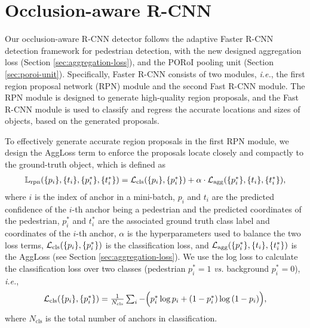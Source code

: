 \documentclass[runningheads]{llncs}
\def\ie{{\em i.e.}}
\begin{document}
\section{Occlusion-aware R-CNN}
Our occlusion-aware R-CNN detector follows the adaptive Faster R-CNN detection framework \cite{DBLP:conf/cvpr/ZhangBS17} for pedestrian detection, with the new designed aggregation loss (Section \ref{sec:aggregation-loss}), and the PORoI pooling unit (Section \ref{sec:poroi-unit}). Specifically, Faster R-CNN \cite{DBLP:journals/pami/RenHG017} consists of two modules, \ie, the first region proposal network (RPN) module and the second Fast R-CNN module. The RPN module is designed to generate high-quality region proposals, and the Fast R-CNN module is used to classify and regress the accurate locations and sizes of objects, based on the generated proposals.

To effectively generate accurate region proposals in the first RPN module, we design the AggLoss term to enforce the proposals locate closely and compactly to the ground-truth object, which is defined as
\begin{equation}
\begin{array}{ll}
\mathbb{L}_{\text{rpn}}(\{ p_i \}, \{ t_i \}, \{ p_i^\ast \}, \{ t_i^\ast \}) =  {\cal L}_{\text{cls}}(\{p_i\}, \{p_i^\ast\}) + \alpha \cdot {\cal L}_{\text{agg}}(\{ p_i^\ast \}, \{ t_i \}, \{ t_i^\ast \}),
\end{array}
\end{equation}
where $i$ is the index of anchor in a mini-batch, $p_i$ and $t_i$ are the predicted confidence of the $i$-th anchor being a pedestrian and the predicted coordinates of the pedestrian, $p_i^\ast$ and $t_i^\ast$ are the associated ground truth class label and coordinates of the $i$-th anchor, $\alpha$ is the hyperparameters used to balance the two loss terms, ${\cal L}_{\text{cls}}(\{p_i\}, \{p_i^\ast\})$ is the classification loss, and ${\cal L}_{\text{agg}}(\{ p_i^\ast \}, \{ t_i \}, \{ t_i^\ast \})$ is the AggLoss (see Section \ref{sec:aggregation-loss}). We use the log loss to calculate the classification loss over two classes (pedestrian $p_i^\ast=1$ {\em vs.} background $p_i^\ast=0$), \ie,
\begin{equation}
\begin{array}{ll}
{\cal L}_{\text{cls}}(\{p_i\},\{p_i^\ast\})=\frac{1}{N_{\text{cls}}}\sum_{i}-\Big(p_i^\ast\log{p_i}+(1-p_i^\ast)\log{(1-p_i)}\Big),
\end{array}
\end{equation}
where $N_{\text{cls}}$ is the total number of anchors in classification.
\end{document}
